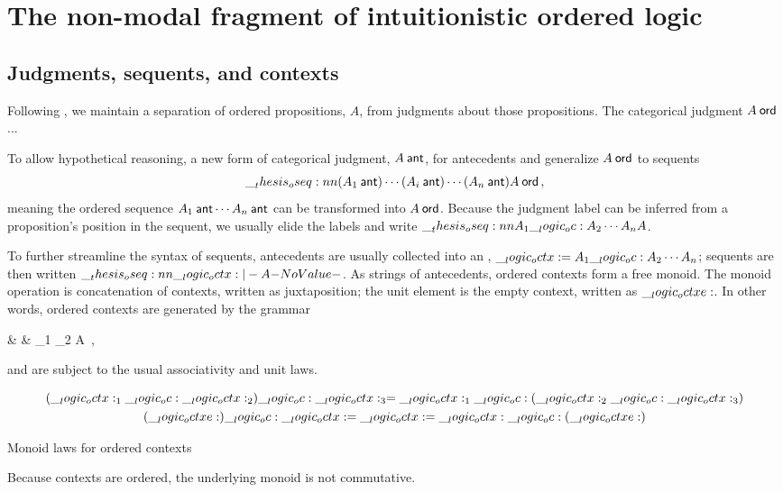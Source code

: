 \clearpage













\section{The non-modal fragment of intuitionistic ordered logic}

\subsection{Judgments, sequents, and contexts}

Following \citeauthor{Martin-Lof:NJPL96}\autocite{Martin-Lof:NJPL96}, we maintain a separation of ordered propositions, $A$, from judgments about those propositions.
  The categorical judgment $A \ord$ ... 

To allow hypothetical reasoning, a new form of categorical judgment, $A \ant$, for antecedents and generalize $A \ord$ to sequents
  \begin{equation*}
    \oseq{(A_1 \ant) \dotsm (A_i \ant) \dotsm (A_n \ant) |- A \ord}
    \,,
  \end{equation*}
  meaning the ordered sequence $A_1 \ant \dotsm A_n \ant$ can be transformed into $A \ord$.
  Because the judgment label can be inferred from a proposition's position in the sequent, we usually elide the labels and write $\oseq{A_1 \oc A_2 \dotsm A_n |- A}$.

To further streamline the syntax of sequents,
antecedents are usually collected into an , $\__logic_octx: = A_1 \__logic_oc: A_2 \dotsm A_n$; sequents are then written $\oseq{\octx |- A}$.
% 
As strings of antecedents, ordered contexts form a free monoid.
The monoid operation is concatenation of contexts, written as juxtaposition; the unit element is the empty context, written as $\__logic_octxe:$.
In other words, ordered contexts are generated by the grammar
\begin{syntax*}
  & \octx & \octx_1 \oc \octx_2 \mid \octxe \mid A \ant
  \,,
\end{syntax*}
and are subject to the usual associativity and unit laws.
\begin{marginfigure}
  \begin{gather*}
    (\__logic_octx:_1 \__logic_oc: \__logic_octx:_2) \__logic_oc: \__logic_octx:_3 = \__logic_octx:_1 \__logic_oc: (\__logic_octx:_2 \__logic_oc: \__logic_octx:_3) \\
    (\__logic_octxe:) \__logic_oc: \__logic_octx: = \__logic_octx: = \__logic_octx: \__logic_oc: (\__logic_octxe:)
  \end{gather*}
  \caption{Monoid laws for ordered contexts}
\end{marginfigure}%
Because contexts are ordered, the underlying monoid is not commutative.


